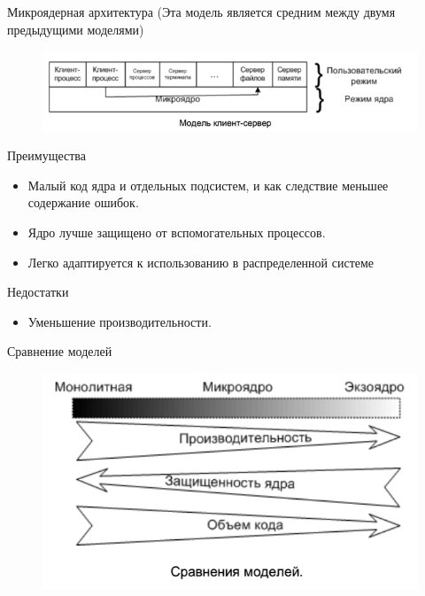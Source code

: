 \documentclass{beamer}
\begin{document}
\begin{frame}[t]
Микроядерная архитектура (Эта модель является средним между двумя предыдущими моделями)
\begin{figure}[h]
\centering
\includegraphics[scale=0.75]{images/lec01-pic06.png}
\end{figure}
Преимущества
\begin{itemize}
\item Малый код ядра и отдельных подсистем, и как следствие меньшее содержание ошибок.
\item Ядро лучше защищено от вспомогательных процессов.
\item Легко адаптируется к использованию в распределенной системе
\end{itemize}
Недостатки 
\begin{itemize}
\item Уменьшение производительности.
\end{itemize}
\end{frame}

\begin{frame}[t]
Сравнение моделей
\begin{figure}[h]
\centering
\includegraphics[scale=0.75]{images/lec01-pic07.png}
\end{figure}
\end{frame}
\end{document}
